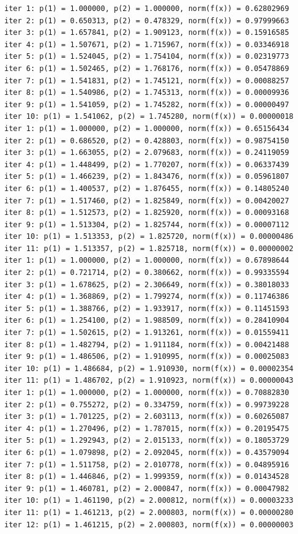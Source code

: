 \documentclass[12pt]{article}
\begin{document}
\begin{tiny}
\begin{verbatim}
iter 1: p(1) = 1.000000, p(2) = 1.000000, norm(f(x)) = 0.62802969
iter 2: p(1) = 0.650313, p(2) = 0.478329, norm(f(x)) = 0.97999663
iter 3: p(1) = 1.657841, p(2) = 1.909123, norm(f(x)) = 0.15916585
iter 4: p(1) = 1.507671, p(2) = 1.715967, norm(f(x)) = 0.03346918
iter 5: p(1) = 1.524045, p(2) = 1.754104, norm(f(x)) = 0.02319773
iter 6: p(1) = 1.502465, p(2) = 1.768176, norm(f(x)) = 0.05478869
iter 7: p(1) = 1.541831, p(2) = 1.745121, norm(f(x)) = 0.00088257
iter 8: p(1) = 1.540986, p(2) = 1.745313, norm(f(x)) = 0.00009936
iter 9: p(1) = 1.541059, p(2) = 1.745282, norm(f(x)) = 0.00000497
iter 10: p(1) = 1.541062, p(2) = 1.745280, norm(f(x)) = 0.00000018
iter 1: p(1) = 1.000000, p(2) = 1.000000, norm(f(x)) = 0.65156434
iter 2: p(1) = 0.686520, p(2) = 0.428803, norm(f(x)) = 0.98754150
iter 3: p(1) = 1.663055, p(2) = 2.079683, norm(f(x)) = 0.24119059
iter 4: p(1) = 1.448499, p(2) = 1.770207, norm(f(x)) = 0.06337439
iter 5: p(1) = 1.466239, p(2) = 1.843476, norm(f(x)) = 0.05961807
iter 6: p(1) = 1.400537, p(2) = 1.876455, norm(f(x)) = 0.14805240
iter 7: p(1) = 1.517460, p(2) = 1.825849, norm(f(x)) = 0.00420027
iter 8: p(1) = 1.512573, p(2) = 1.825920, norm(f(x)) = 0.00093168
iter 9: p(1) = 1.513304, p(2) = 1.825744, norm(f(x)) = 0.00007112
iter 10: p(1) = 1.513353, p(2) = 1.825720, norm(f(x)) = 0.00000486
iter 11: p(1) = 1.513357, p(2) = 1.825718, norm(f(x)) = 0.00000002
iter 1: p(1) = 1.000000, p(2) = 1.000000, norm(f(x)) = 0.67898644
iter 2: p(1) = 0.721714, p(2) = 0.380662, norm(f(x)) = 0.99335594
iter 3: p(1) = 1.678625, p(2) = 2.306649, norm(f(x)) = 0.38018033
iter 4: p(1) = 1.368869, p(2) = 1.799274, norm(f(x)) = 0.11746386
iter 5: p(1) = 1.388766, p(2) = 1.933917, norm(f(x)) = 0.11451593
iter 6: p(1) = 1.254100, p(2) = 1.988509, norm(f(x)) = 0.28410904
iter 7: p(1) = 1.502615, p(2) = 1.913261, norm(f(x)) = 0.01559411
iter 8: p(1) = 1.482794, p(2) = 1.911184, norm(f(x)) = 0.00421488
iter 9: p(1) = 1.486506, p(2) = 1.910995, norm(f(x)) = 0.00025083
iter 10: p(1) = 1.486684, p(2) = 1.910930, norm(f(x)) = 0.00002354
iter 11: p(1) = 1.486702, p(2) = 1.910923, norm(f(x)) = 0.00000043
iter 1: p(1) = 1.000000, p(2) = 1.000000, norm(f(x)) = 0.70882830
iter 2: p(1) = 0.755272, p(2) = 0.334759, norm(f(x)) = 0.99739228
iter 3: p(1) = 1.701225, p(2) = 2.603113, norm(f(x)) = 0.60265087
iter 4: p(1) = 1.270496, p(2) = 1.787015, norm(f(x)) = 0.20195475
iter 5: p(1) = 1.292943, p(2) = 2.015133, norm(f(x)) = 0.18053729
iter 6: p(1) = 1.079898, p(2) = 2.092045, norm(f(x)) = 0.43579094
iter 7: p(1) = 1.511758, p(2) = 2.010778, norm(f(x)) = 0.04895916
iter 8: p(1) = 1.446846, p(2) = 1.999359, norm(f(x)) = 0.01434528
iter 9: p(1) = 1.460781, p(2) = 2.000847, norm(f(x)) = 0.00047982
iter 10: p(1) = 1.461190, p(2) = 2.000812, norm(f(x)) = 0.00003233
iter 11: p(1) = 1.461213, p(2) = 2.000803, norm(f(x)) = 0.00000280
iter 12: p(1) = 1.461215, p(2) = 2.000803, norm(f(x)) = 0.00000003


\end{verbatim}
\end{tiny}
\end{document}
